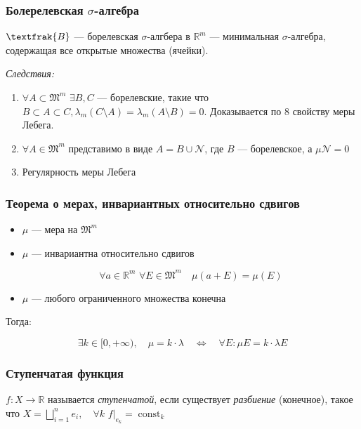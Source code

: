 \documentclass{article}
\def\dbl{\,\,}
\DeclareMathOperator{\const}{const}
\begin{document}
\subsubsection{Болерелевская $\sigma$-алгебра}

$\textfrak{B}$ --- борелевская $\sigma$-алгбера в $\mathbb{R}^m$ --- минимальная $\sigma$-алгебра, содержащая все открытые множества (ячейки).

\textit{Следствия:}

\begin{enumerate}
    \item $\forall A \subset \mathfrak{M}^m \dbl \exists B, C$ --- борелевские, такие что $B \subset A \subset C, \lambda_m(C \setminus A) = \lambda_m(A \setminus B) = 0$. Доказывается по 8 свойству меры Лебега.
    \item $\forall A \in \mathfrak{M}^m$ представимо в виде $A = B \cup \mathcal{N}$, где $B$ --- борелевское, а $\mu \mathcal{N} = 0$
    \item Регулярность меры Лебега
\end{enumerate}

\subsubsection{Теорема о мерах, инвариантных относительно сдвигов}

\begin{itemize}
    \item $\mu$ --- мера на $\mathfrak{M}^m$
    \item $\mu$ --- инвариантна относительно сдвигов 
    
    \[\forall a \in \mathbb{R}^m \dbl \forall E \in \mathfrak{M}^m \quad \mu(a + E) = \mu(E)\]

    \item $\mu$ --- любого ограниченного множества конечна
\end{itemize}

Тогда:

\[\exists k \in [0, +\infty), \quad \mu = k \cdot \lambda \quad \Leftrightarrow \quad \forall E: \mu E = k \cdot \lambda E\]

\subsubsection{Ступенчатая функция}

$f: X \rightarrow \mathbb{R}$ называется \textit{ступенчатой}, если существует \textit{разбиение} (конечное), такое что $X = \bigsqcup_{i = 1}^{n} e_i, \quad \forall k \dbl f|_{e_k} = \const_k$
\end{document}
